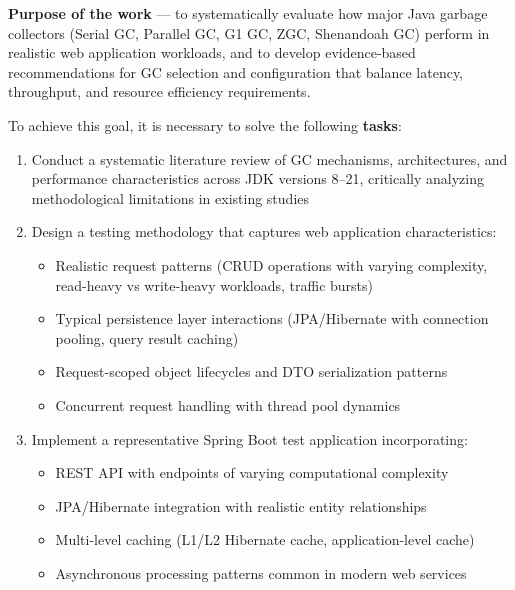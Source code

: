 \textbf{Purpose of the work} --- to systematically evaluate how major Java garbage collectors (Serial GC, Parallel GC, G1 GC, ZGC, Shenandoah GC) perform in realistic web application workloads, and to develop evidence-based recommendations for GC selection and configuration that balance latency, throughput, and resource efficiency requirements.

To achieve this goal, it is necessary to solve the following \textbf{tasks}:

\begin{enumerate}
    \item Conduct a systematic literature review of GC mechanisms, architectures, and performance characteristics across JDK versions 8--21, critically analyzing methodological limitations in existing studies
    
    \item Design a testing methodology that captures web application characteristics:
    \begin{itemize}
        \item Realistic request patterns (CRUD operations with varying complexity, read-heavy vs write-heavy workloads, traffic bursts)
        \item Typical persistence layer interactions (JPA/Hibernate with connection pooling, query result caching)
        \item Request-scoped object lifecycles and DTO serialization patterns
        \item Concurrent request handling with thread pool dynamics
    \end{itemize}
    
    \item Implement a representative Spring Boot test application incorporating:
    \begin{itemize}
        \item REST API with endpoints of varying computational complexity
        \item JPA/Hibernate integration with realistic entity relationships
        \item Multi-level caching (L1/L2 Hibernate cache, application-level cache)
        \item Asynchronous processing patterns common in modern web services
    \end{itemize}
    

\end{enumerate}

